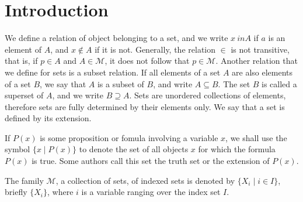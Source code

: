 \documentclass[letterpaper, 10pt]{article}
\newcommand{\set}[1]{\{#1\}}
\begin{document}
\section{Introduction}
We define a relation of object belonging to a set, and we write
$x \ in A$ if $a$ is an element of $A$, and $x \not\in A$ if it is not.
Generally, the relation $\in$ is not transitive, that is, if $p \in A$ and $A
\in \mathcal{M}$, it does not follow that $p \in \mathcal{M}$.
Another relation that we define for sets is a subset relation. If all elements
of a set $A$ are also elements of a set $B$, we say that $A$ is a subset of $B$,
and write $A \subseteq B$. The set $B$ is called a superset of $A$, and we write
$B \supseteq A$.
Sets are unordered collections of elements, therefore sets are fully determined
by their elements only. We say that a set is defined by its extension.

If $P(x)$ is some proposition or fomula involving a variable $x$, we shall use
the symbol $\set{x \mid P(x)}$ to denote the set of all objects $x$ for which
the formula $P(x)$ is true. Some authors call this set the truth set or the
extension of $P(x)$.

The family $\mathcal{M}$, a collection of sets, of indexed sets is denoted by
$\set{X_i \mid i \in I}$, briefly $\set{X_i}$, where $i$ is a variable ranging
over the index set $I$.
\end{document}
